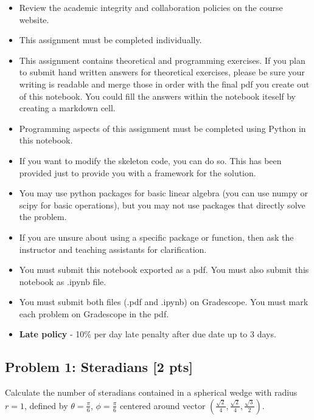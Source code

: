 \documentclass[11pt]{article}
\providecommand{\tightlist}{%
      \setlength{\itemsep}{0pt}\setlength{\parskip}{0pt}}
\begin{document}
\begin{itemize}
\tightlist
\item
  Review the academic integrity and collaboration policies on the course
  website.
\item
  This assignment must be completed individually.
\item
  This assignment contains theoretical and programming exercises. If you
  plan to submit hand written answers for theoretical exercises, please
  be sure your writing is readable and merge those in order with the
  final pdf you create out of this notebook. You could fill the answers
  within the notebook iteself by creating a markdown cell.
\item
  Programming aspects of this assignment must be completed using Python
  in this notebook.
\item
  If you want to modify the skeleton code, you can do so. This has been
  provided just to provide you with a framework for the solution.
\item
  You may use python packages for basic linear algebra (you can use
  numpy or scipy for basic operations), but you may not use packages
  that directly solve the problem.
\item
  If you are unsure about using a specific package or function, then ask
  the instructor and teaching assistants for clarification.
\item
  You must submit this notebook exported as a pdf. You must also submit
  this notebook as .ipynb file.
\item
  You must submit both files (.pdf and .ipynb) on Gradescope. You must
  mark each problem on Gradescope in the pdf.
\item
  \textbf{Late policy} - 10\% per day late penalty after due date up to
  3 days.
\end{itemize}

    \subsection{Problem 1: Steradians {[}2
pts{]}}\label{problem-1-steradians-2-pts}

Calculate the number of steradians contained in a spherical wedge with
radius \(r = 1\), defined by \(\theta=\frac{\pi}{6}\),
\(\phi=\frac{\pi}{6}\) centered around vector
\((\frac{\sqrt{2}}{4}, \frac{\sqrt{2}}{4}, \frac{\sqrt{3}}{2})\).
\end{document}
